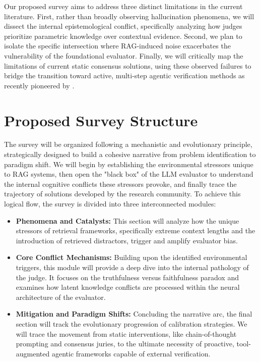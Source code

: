 \documentclass[11pt]{article}
\begin{document}
Our proposed survey aims to address three distinct limitations in the current literature. First, rather than broadly observing hallucination phenomena, we will dissect the internal epistemological conflict, specifically analyzing how judges prioritize parametric knowledge over contextual evidence. Second, we plan to isolate the specific intersection where RAG-induced noise exacerbates the vulnerability of the foundational evaluator. Finally, we will critically map the limitations of current static consensus solutions, using these observed failures to bridge the transition toward active, multi-step agentic verification methods as recently pioneered by \citet{you2026agentasajudge}.

\section{Proposed Survey Structure}
The survey will be organized following a mechanistic and evolutionary principle, strategically designed to build a cohesive narrative from problem identification to paradigm shift. We will begin by establishing the environmental stressors unique to RAG systems, then open the "black box" of the LLM evaluator to understand the internal cognitive conflicts these stressors provoke, and finally trace the trajectory of solutions developed by the research community. To achieve this logical flow, the survey is divided into three interconnected modules:

\begin{itemize}
\item \textbf{Phenomena and Catalysts:} This section will analyze how the unique stressors of retrieval frameworks, specifically extreme context lengths and the introduction of retrieved distractors, trigger and amplify evaluator bias.
\item \textbf{Core Conflict Mechanisms:} Building upon the identified environmental triggers, this module will provide a deep dive into the internal pathology of the judge. It focuses on the truthfulness versus faithfulness paradox and examines how latent knowledge conflicts are processed within the neural architecture of the evaluator.
\item \textbf{Mitigation and Paradigm Shifts:} Concluding the narrative arc, the final section will track the evolutionary progression of calibration strategies. We will trace the movement from static interventions, like chain-of-thought prompting and consensus juries, to the ultimate necessity of proactive, tool-augmented agentic frameworks capable of external verification.
\end{itemize}
\end{document}
